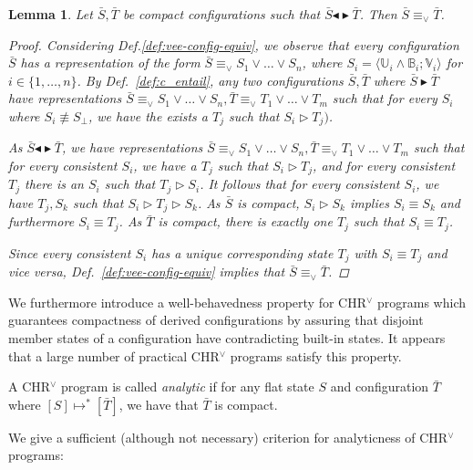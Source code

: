 \documentclass[acmtocl]{acmtrans2m}
\newtheorem{lemma}[theorem]{Lemma}
\newcommand\state[1]{\langle #1 \rangle}
\newcommand\ent{\rhd}
\newcommand\entv{\blacktriangleright}
\renewcommand\sim{{\blacktriangleleft\blacktriangleright}}
\newcommand\equv{\equiv_\vee}
\newcommand{\B}{\ensuremath{\mathbb{B}}}
\newcommand{\U}{\ensuremath{\mathbb{U}}}
\newcommand{\V}{\ensuremath{\mathbb{V}}}
\newcommand{\bS}{\bar{S}}
\newcommand{\bT}{\bar{T}}
\begin{document}
\begin{lemma}
 Let $\bS,\bT$ be compact configurations such that $\bS\sim\bT$. Then $\bS\equv\bT$.
\begin{proof}
 Considering Def.\ref{def:vee-config-equiv}, we observe that every configuration
 $\bS$ has a representation of the form $\bS\equv S_1\vee\ldots\vee S_n$, where
 $S_i=\state{\U_i\wedge\B_i;\V_i}$ for $i\in\{1,\ldots,n\}$. By
 Def.~\ref{def:c_entail}, any two configurations $\bS,\bT$ where $\bS\entv\bT$
 have representations $\bS\equv S_1\vee\ldots\vee S_n, \bT\equv T_1\vee\ldots\vee
 T_m$ such that for every $S_i$ where $S_i\not\equiv S_\bot$, we have the exists
 a $T_j$ such that $S_i\ent T_j)$.

 As $\bS\sim\bT$, we have representations $\bS\equv S_1\vee\ldots\vee S_n,
 \bT\equv T_1\vee\ldots\vee T_m$ such that for every consistent $S_i$, we have a
 $T_j$ such that $S_i\ent T_j$, and for every consistent $T_j$ there is an $S_i$
 such that $T_j\ent S_i$. It follows that for every consistent $S_i$, we have
 $T_j, S_k$ such that $S_i\ent T_j \ent S_k$. As $\bS$ is compact, $S_i\ent S_k$
 implies $S_i\equiv S_k$ and furthermore $S_i\equiv T_j$. As $\bT$ is compact,
 there is exactly one $T_j$ such that $S_i\equiv T_j$.

 Since every consistent $S_i$ has a unique corresponding state $T_j$ with
 $S_i\equiv T_j$ and vice versa, Def.~\ref{def:vee-config-equiv} implies that
 $\bS\equv\bT$.
\end{proof}
\end{lemma}

We furthermore introduce a well-behavedness property for CHR$^\vee$ programs
which guarantees compactness of derived configurations by assuring that
disjoint member states of a configuration have contradicting built-in states. It
appears that a large number of practical CHR$^\vee$ programs satisfy this property.

\begin{definition}
\label{def:analytic}
A CHR$^\vee$ program is called \emph{analytic} if for any flat state $S$
and configuration $\bT$ where $[S]\mapsto^{*}[\bT]$, we have that $\bT$ is compact.
\end{definition}

We give a sufficient (although not necessary) criterion for analyticness
of CHR$^\vee$ programs:
\end{document}

